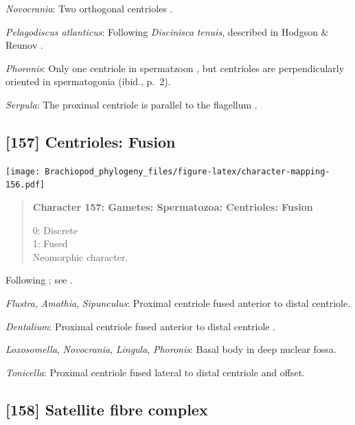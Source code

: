 \documentclass[openany]{book}
\begin{document}
\hypertarget{Novocrania-coding-156}{}
\emph{Novocrania}: Two orthogonal centrioles
\citep{Afzelius1978Finestructure}.

\hypertarget{Pelagodiscus_atlanticus-coding-156}{}
\emph{Pelagodiscus atlanticus}: Following \emph{Discinisca}
\emph{tenuis}, described in Hodgson \& Reunov
\citeyearpar{Hodgson1994Ultrastructureof}.

\hypertarget{Phoronis-coding-156}{}
\emph{Phoronis}: Only one centriole in spermatzoon
\citep[p.~7]{Reunov2004Ultrastructuralstudy}, but centrioles are
perpendicularly oriented in spermatogonia (ibid., p.~2).

\hypertarget{Serpula-coding-156}{}
\emph{Serpula}: The proximal centriole is parallel to the flagellum
\citep{Gherardi2011}.

\subsection*{{[}157{]} Centrioles: Fusion}\label{centrioles-fusion}

\texttt{[image: Brachiopod\_phylogeny\_files/figure-latex/character-mapping-156.pdf]}

\begin{quote}
\textbf{Character 157: Gametes: Spermatozoa: Centrioles: Fusion}

0: Discrete\\
1: Fused\\
Neomorphic character.
\end{quote}

Following \citet{Smith2012}; see \citet{BucklandNicks2008}.

\hypertarget{Amathia-coding-157}{}
\emph{Flustra}, \emph{Amathia}, \emph{Sipunculus}: Proximal centriole
fused anterior to distal centriole.

\hypertarget{Dentalium-coding-157}{}
\emph{Dentalium}: Proximal centriole fused anterior to distal centriole
\citep{DufresneDube1983}.

\hypertarget{Lingula-coding-157}{}
\emph{Loxosomella}, \emph{Novocrania}, \emph{Lingula}, \emph{Phoronis}:
Basal body in deep nuclear fossa.

\hypertarget{Tonicella-coding-157}{}
\emph{Tonicella}: Proximal centriole fused lateral to distal centriole
and offset.

\subsection*{{[}158{]} Satellite fibre
complex}\label{satellite-fibre-complex}
\end{document}
